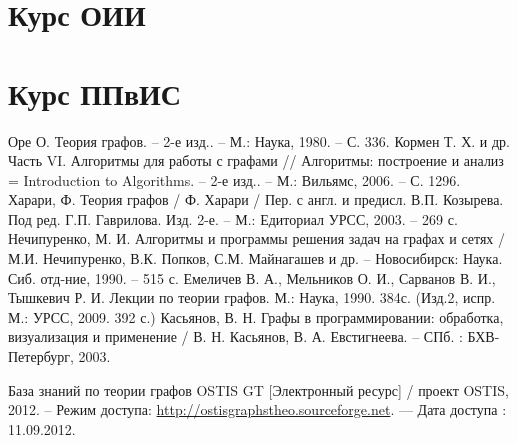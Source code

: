 \documentclass[a4paper,12pt]{report}
\begin{document}

\tableofcontents

\part{Курс ОИИ}





\part{Курс ППвИС}




%

\newpage 
\begin{thebibliography}{99}

 Оре О. Теория графов. -- 2-е изд.. -- М.: Наука,
  1980. -- С. 336.
 Кормен Т. Х. и др. Часть VI. Алгоритмы для
  работы с графами // Алгоритмы: построение и анализ = Introduction to
  Algorithms. -- 2-е изд.. -- М.: Вильямс, 2006. -- С. 1296.
 Харари, Ф. Теория графов / Ф. Харари / Пер. с
  англ. и предисл. В.П. Козырева. Под ред. Г.П. Гаврилова. Изд. 2-е. --
  М.: Едиториал УРСС, 2003. -- 269 с.
 Нечипуренко, М. И. Алгоритмы и программы
  решения задач на графах и сетях / М.И. Нечипуренко, В.К. Попков,
  С.М. Майнагашев и др. -- Новосибирск: Наука. Сиб. отд-ние, 1990. --
  515 с.
 Емеличев В. А., Мельников О. И., Сарванов
  В. И., Тышкевич Р. И. Лекции по теории графов. М.: Наука,
  1990. 384с. (Изд.2, испр. М.: УРСС, 2009. 392 с.)
 Касьянов, В. Н. Графы в программировании:
  обработка, визуализация и применение / В. Н. Касьянов,
  В. А. Евстигнеева. -- СПб. : БХВ-Петербург, 2003.

 База знаний по теории графов OSTIS GT [Электронный
  ресурс] / проект OSTIS, 2012. -- Режим доступа:
  \href{http://ostisgraphstheo.sourceforge.net}{http://ostisgraphstheo.sourceforge.net}. ---
  Дата доступа : 11.09.2012.

\end{thebibliography}
\end{document}
